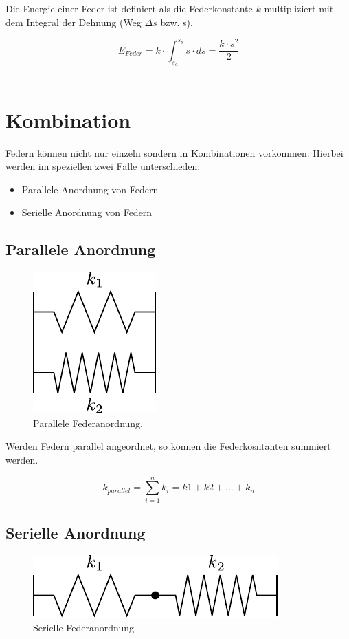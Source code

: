 Die Energie einer Feder ist definiert als die Federkonstante $k$ multipliziert
mit dem Integral der Dehnung (Weg $\Delta s$ bzw. s).

\[ \boxed{E_{Feder} = k \cdot \int_{s_a}^{s_b} s \cdot ds = \frac{k \cdot s^2}{2}} \] \\

\section{Kombination}
Federn können nicht nur einzeln sondern in Kombinationen vorkommen. Hierbei
werden im speziellen zwei Fälle unterschieden:

\begin{itemize}
	\item Parallele Anordnung von Federn
	\item Serielle Anordnung von Federn
\end{itemize}

\subsection{Parallele Anordnung}

\begin{figure}[h!]
	\centering
	\includegraphics[scale=0.75]{feder-parallel.pdf}
	\caption{Parallele Federanordnung.}
	\label{fig:feder-parallel}
\end{figure}

\noindent
Werden Federn parallel angeordnet, so können die Federkosntanten summiert 
werden.

\[ \boxed{k_{parallel} = \sum_{i=1}^n k_i = k1 + k2 + \dots + k_n} \]

\subsection{Serielle Anordnung}

\begin{figure}[h!]
	\centering
	\includegraphics[scale=0.75]{feder-seriell.pdf}
	\caption{Serielle Federanordnung}
	\label{fig:feder-seriell}
\end{figure}

